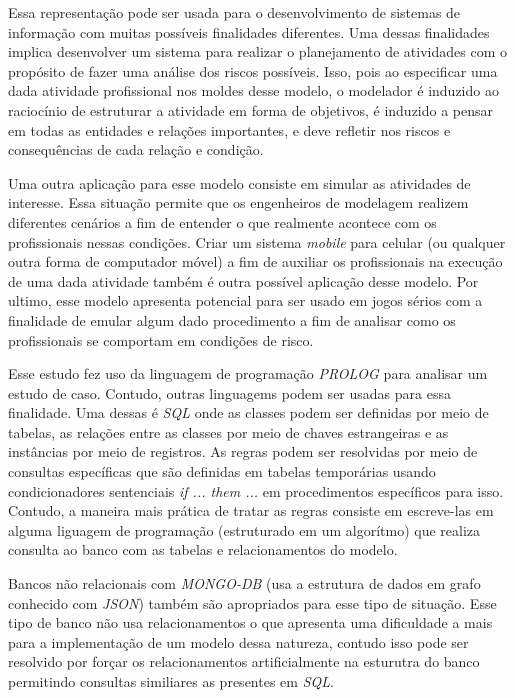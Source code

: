 Essa representação pode ser usada para o desenvolvimento de sistemas de informação com muitas possíveis finalidades diferentes. Uma dessas finalidades implica desenvolver um sistema para realizar o planejamento de atividades com o propósito de fazer uma análise dos riscos possíveis. Isso, pois ao especificar uma dada atividade profissional nos moldes desse modelo, o modelador é induzido ao raciocínio de estruturar a atividade em forma de objetivos, é induzido a pensar em todas as entidades e relações importantes, e deve refletir nos riscos e consequências de cada relação e condição. 

Uma outra aplicação para esse modelo consiste em simular as atividades de interesse. 
Essa situação permite que os engenheiros de modelagem realizem diferentes cenários a fim de entender o que realmente acontece com os profissionais nessas condições. Criar um sistema \textit{mobile} para celular (ou qualquer outra forma de computador móvel) a fim de auxiliar os profissionais na execução de uma dada atividade também é outra possível aplicação desse modelo. Por ultimo, esse modelo apresenta potencial para ser usado em jogos sérios com a finalidade de emular algum dado procedimento a fim 
de analisar como os profissionais se comportam em condições de risco. 

Esse estudo fez uso da linguagem de programação \textit{PROLOG} para analisar um estudo de caso. Contudo, outras linguagems podem ser usadas para essa finalidade. Uma dessas é \textit{SQL} onde as classes podem ser definidas por meio de tabelas, as relações entre as classes por meio de chaves estrangeiras e as instâncias por meio de registros. As regras podem ser resolvidas por meio de consultas específicas que são definidas em tabelas temporárias usando condicionadores sentenciais \textit{if ... them ...} em procedimentos específicos para isso. Contudo, a maneira mais prática de tratar as regras consiste em escreve-las em alguma liguagem de programação (estruturado em um algorítmo) que realiza consulta ao banco com as tabelas e relacionamentos do modelo. 

Bancos não relacionais com \textit{MONGO-DB} (usa a estrutura de dados em grafo conhecido com \textit{JSON}) também são apropriados para esse tipo de situação. Esse tipo 
de banco não usa relacionamentos o que apresenta uma dificuldade a mais para a implementação de um modelo dessa natureza, contudo isso pode ser resolvido por forçar os relacionamentos artificialmente na esturutra do banco permitindo consultas similiares as presentes em \textit{SQL}.

